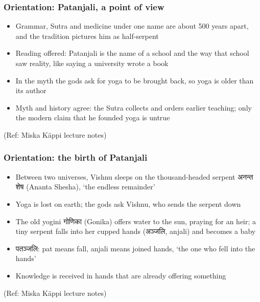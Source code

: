 \begin{frame}[fragile]\frametitle{Orientation: Patanjali, a point of view}

	\begin{itemize}
	\item Grammar, Sutra and medicine under one name are about 500 years apart, and the tradition pictures him as half-serpent
	\item Reading offered: Patanjali is the name of a school and the way that school saw reality, like saying a university wrote a book
	\item In the myth the gods ask for yoga to be brought back, so yoga is older than its author
	\item Myth and history agree: the Sutra collects and orders earlier teaching; only the modern claim that he founded yoga is untrue
	\end{itemize}

\tiny{(Ref: Miska Käppi lecture notes)}

\end{frame}

\begin{frame}[fragile]\frametitle{Orientation: the birth of Patanjali}

	\begin{itemize}
	\item Between two universes, Vishnu sleeps on the thousand-headed serpent अनन्त शेष (Ananta Shesha), `the endless remainder'
	\item Yoga is lost on earth; the gods ask Vishnu, who sends the serpent down
	\item The old yogini गोणिका (Gonika) offers water to the sun, praying for an heir; a tiny serpent falls into her cupped hands (अञ्जलि, anjali) and becomes a baby
	\item पतञ्जलि: pat means fall, anjali means joined hands, `the one who fell into the hands'
	\item Knowledge is received in hands that are already offering something
	\end{itemize}

\tiny{(Ref: Miska Käppi lecture notes)}

\end{frame}

